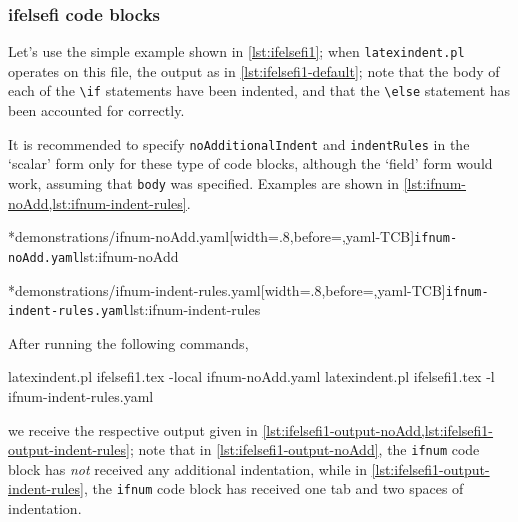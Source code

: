 \subsubsection{ifelsefi code blocks}
	Let's use the simple example shown in \cref{lst:ifelsefi1}; when \texttt{latexindent.pl}
	operates on this file, the output as in \cref{lst:ifelsefi1-default}; note that the body of
	each of the \lstinline!\if! statements have been indented, and that the
	\lstinline!\else! statement has been accounted for correctly.

	\begin{minipage}{.45\textwidth}
	\end{minipage}%
	\hfill
	\begin{minipage}{.54\textwidth}
	\end{minipage}

	It is recommended to specify \texttt{noAdditionalIndent} and \texttt{indentRules} in the
	`scalar' form only for these type of code blocks, although the `field' form would work,
	assuming that \texttt{body} was specified. Examples are shown in
	\cref{lst:ifnum-noAdd,lst:ifnum-indent-rules}.

	\begin{minipage}{.45\textwidth}
		\cmhlistingsfromfile[style=yaml-LST]*{demonstrations/ifnum-noAdd.yaml}[width=.8\linewidth,before=\centering,yaml-TCB]{\texttt{ifnum-noAdd.yaml}}{lst:ifnum-noAdd}
	\end{minipage}
	\hfill
	\begin{minipage}{.45\textwidth}
		\cmhlistingsfromfile[style=yaml-LST]*{demonstrations/ifnum-indent-rules.yaml}[width=.8\linewidth,before=\centering,yaml-TCB]{\texttt{ifnum-indent-rules.yaml}}{lst:ifnum-indent-rules}
	\end{minipage}

	After running the following commands,
	\begin{commandshell}
latexindent.pl ifelsefi1.tex -local ifnum-noAdd.yaml  
latexindent.pl ifelsefi1.tex -l ifnum-indent-rules.yaml  
\end{commandshell}
	we receive the respective output given in \cref{lst:ifelsefi1-output-noAdd,lst:ifelsefi1-output-indent-rules}; note that in
	\cref{lst:ifelsefi1-output-noAdd}, the \texttt{ifnum} code block has \emph{not}
	received any additional indentation, while in \cref{lst:ifelsefi1-output-indent-rules}, the
	\texttt{ifnum} code block has received one tab and two spaces of indentation.

